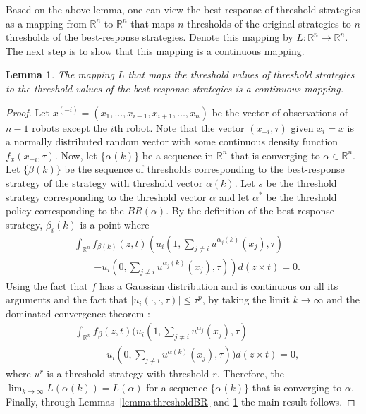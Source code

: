 \documentclass[defaultstyle,12pt]{proposal}
\newtheorem{lemma}{Lemma}
\def\R{\mathbb{R}}    %
\begin{document}
Based on the above lemma, one can view the best-response of threshold strategies as a mapping from $\R^n$ to $\R^n$ that maps $n$ thresholds of the original strategies to $n$ thresholds of the best-response strategies. Denote this mapping by $L:\R^n\to\R^n$. The next step is to show that this mapping is a continuous mapping. 
\begin{lemma}\label{lemma:continuous}
The mapping $L$ that maps the threshold values of threshold strategies to the threshold values of the best-response strategies is a continuous mapping. 
\end{lemma}
\begin{proof}
Let $x^{(-i)}=(x_1,\ldots,x_{i-1},x_{i+1},\ldots,x_n)$ be the vector of observations of $n-1$ robots except the $i$th robot. Note that the vector $(x_{-i},\tau)$ given $x_i=x$ is a normally distributed random vector with some continuous density function $f_{x}(x_{-i},\tau)$. Now, let $\{\alpha(k)\}$ be a sequence in $\R^n$ that is converging to $\alpha\in\R^n$. Let $\{\beta(k)\}$ be the sequence of thresholds corresponding to the best-response strategy of the strategy with threshold vector $\alpha(k)$. Let $s$ be the threshold strategy corresponding to the threshold vector $\alpha$ and let $\alpha^*$ be the threshold policy corresponding to the $BR(\alpha)$. By the definition of the best-response strategy, $\beta_i(k)$ is a point where 
\begin{align*}
&\int_{\R^{n}}f_{\beta(k)}(z,t)\left(u_i(1,\sum_{j\not=i}u^{\alpha_j(k)}(x_j),\tau)\right.\\
&\qquad\left.-u_i(0,\sum_{j\not=i}u^{\alpha_j(k)}(x_j),\tau)\right)d(z\times t)=0.
\end{align*}
Using the fact that $f$ has a Gaussian distribution and is continuous on all its arguments and the fact that $|u_i(\cdot,\cdot,\tau)|\leq \tau^p$, by taking the limit $k\to\infty$ and the dominated convergence theorem \cite{Folland2013}:
\begin{align*}
&\int_{\R^{n}}f_{\beta}(z,t)(u_i(1,\sum_{j\not=i}u^{\alpha_j}(x_j),\tau)\\ 
&\qquad-u_i(0,\sum_{j\not=i}u^{\alpha(k)}(x_j),\tau))d(z\times t)=0,
\end{align*}
where $u^{r}$ is a threshold strategy with threshold $r$. Therefore, the $\lim_{k\to\infty}L(\alpha(k))=L(\alpha)$ for a sequence $\{\alpha(k)\}$ that is converging to $\alpha$. Finally, through Lemmas~\ref{lemma:thresholdBR} and \ref{lemma:continuous} the main result follows. 
\end{proof}
\end{document}
